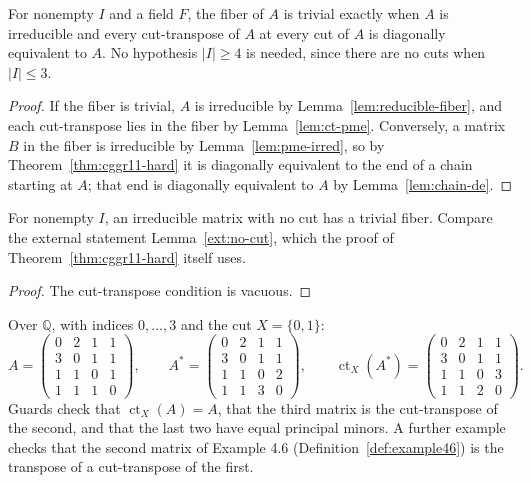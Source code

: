 \begin{theorem}
\label{thm:main-alt}
\leanok
{}
For nonempty $I$ and a field $F$, the fiber of $A$ is trivial exactly when $A$ is
irreducible and every cut-transpose of $A$ at every cut of $A$ is diagonally equivalent to
$A$. No hypothesis $|I|\ge4$ is needed, since there are no cuts when $|I|\le3$.
\end{theorem}
\begin{proof}
\leanok
If the fiber is trivial, $A$ is irreducible by Lemma~\ref{lem:reducible-fiber}, and each
cut-transpose lies in the fiber by Lemma~\ref{lem:ct-pme}. Conversely, a matrix $B$ in the
fiber is irreducible by Lemma~\ref{lem:pme-irred}, so by Theorem~\ref{thm:cggr11-hard} it is
diagonally equivalent to the end of a chain starting at $A$; that end is diagonally
equivalent to $A$ by Lemma~\ref{lem:chain-de}.
\end{proof}

\begin{corollary}[No cut]
\label{cor:no-cut}
\leanok
{}
For nonempty $I$, an irreducible matrix with no cut has a trivial fiber. Compare the
external statement Lemma~\ref{ext:no-cut}, which the proof of
Theorem~\ref{thm:cggr11-hard} itself uses.
\end{corollary}
\begin{proof}
\leanok
The cut-transpose condition is vacuous.
\end{proof}

\begin{definition}[Examples]
\label{def:ct-examples}
\leanok
{}
Over $\mathbb{Q}$, with indices $0,\dots,3$ and the cut $X=\{0,1\}$:
\[ A=\begin{pmatrix}0&2&1&1\\3&0&1&1\\1&1&0&1\\1&1&1&0\end{pmatrix},\qquad
   A^*=\begin{pmatrix}0&2&1&1\\3&0&1&1\\1&1&0&2\\1&1&3&0\end{pmatrix},\qquad
   \operatorname{ct}_X(A^*)=\begin{pmatrix}0&2&1&1\\3&0&1&1\\1&1&0&3\\1&1&2&0\end{pmatrix}. \]
Guards check that $\operatorname{ct}_X(A)=A$, that the third matrix is the cut-transpose
of the second, and that the last two have equal principal minors. A further example
checks that the second matrix of Example 4.6 (Definition~\ref{def:example46}) is the
transpose of a cut-transpose of the first.
\end{definition}

